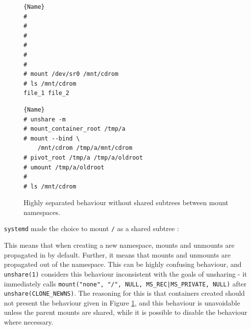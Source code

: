 \documentclass[sigplan]{acmart}
\begin{document}
\begin{figure}
\begin{minipage}{.45\textwidth}

\begin{lstlisting}[frame=tlrb]{Name}
#
#
#
#
#
#
# mount /dev/sr0 /mnt/cdrom
# ls /mnt/cdrom
file_1 file_2
\end{lstlisting}

\end{minipage}\hfill
\begin{minipage}{.45\textwidth}

\begin{lstlisting}[frame=tlrb,showlines=true]{Name}
# unshare -m
# mount_container_root /tmp/a
# mount --bind \
    /mnt/cdrom /tmp/a/mnt/cdrom
# pivot_root /tmp/a /tmp/a/oldroot
# umount /tmp/a/oldroot
#
# ls /mnt/cdrom

\end{lstlisting}

\end{minipage}

\caption{Highly separated behaviour without shared subtrees between mount namespaces.}
\label{fig:shared-subtrees}
\end{figure}

\texttt{systemd} made the choice to mount \texttt{/} as a shared subtree \citep{free_software_foundation_mount_namespaces7_2021}:


This means that when creating a new namespace, mounts and unmounts are propagated in by default. Further, it means that mounts and unmounts are propagated out of the namespace. This can be highly confusing behaviour, and \texttt{unshare(1)} considers this behaviour inconsistent with the goals of unsharing - it immediately calls \texttt{mount("none", "/", NULL, MS\_REC|MS\_PRIVATE, NULL)} after \texttt{unshare(CLONE\_NEWNS)}. The reasoning for this is that containers created should not present the behaviour given in Figure \ref{fig:shared-subtrees}, and this behaviour is unavoidable unless the parent mounts are shared, while it is possible to disable the behaviour where necessary.
\end{document}

